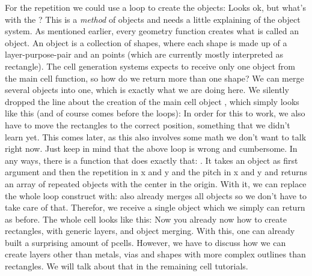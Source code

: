 For the repetition we could use a loop to create the objects:
Looks ok, but what's with the ? This is a \emph{method} of objects and needs a little explaining of the object system. As mentioned
earlier, every geometry function creates what is called an object. An object is a collection of shapes, where each shape is made up of a layer-purpose-pair and an
points (which are currently mostly interpreted as rectangle). The cell generation systems expects to receive only one object from the main cell function, so
how do we return more than one shape? We can merge several objects into one, which is exactly what we are doing here. We silently dropped the line about the creation
of the main cell object , which simply looks like this (and of course comes before the loops):
In order for this to work, we also have to move the rectangles to the correct position, something that we didn't learn yet. This comes later, as this also involves
some math we don't want to talk right now. Just keep in mind that the above loop is wrong and cumbersome. In any ways, there is a function that does exactly that:
. It takes an object as first argument and then the repetition in x and y and the pitch in x and y and returns an array of repeated
objects with the center in the origin. With it, we can replace the whole loop construct with:
 also already merges all objects so we don't have to take care of that. Therefor, we receive a single object which we simply can return as
before. The whole cell looks like this:
Now you already now how to create rectangles, with generic layers,  and object merging. With this, one can already built a
surprising amount of pcells. However, we have to discuss how we can create layers other than metals, vias and shapes with more complex outlines than rectangles. We
will talk about that in the remaining cell tutorials.

